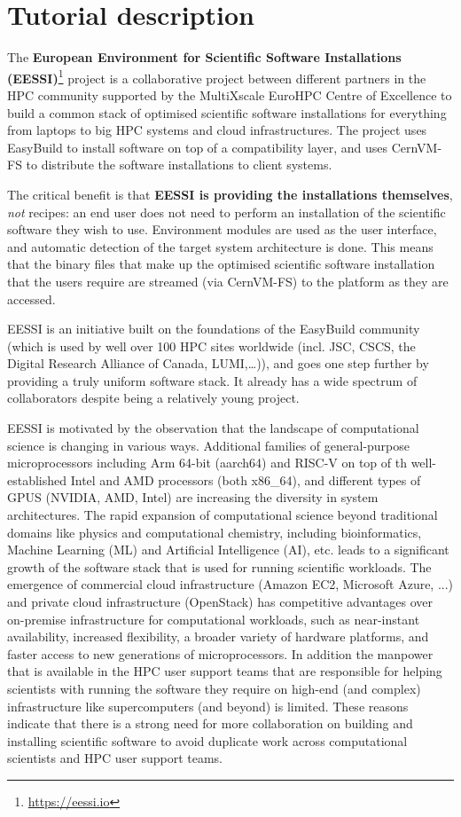 \section*{Tutorial description}

The \textbf{European Environment for Scientific Software Installations
(EESSI)}\footnote{\href{https://eessi.io}{https://eessi.io}} project is a collaborative project
between different partners in the HPC community supported by the MultiXscale EuroHPC Centre of Excellence to build a
common stack of optimised scientific software installations for everything from laptops to big HPC systems and cloud
infrastructures.
The project uses EasyBuild to install software on top of a compatibility layer, and uses CernVM-FS to
distribute the software installations to client systems.

The critical benefit is that \textbf{EESSI is providing the
installations themselves}, \textit{not} recipes: an end user does not need to perform an installation
of the scientific software they wish to use.
Environment modules are used as the user interface, and automatic
detection of the target system architecture is done.
This means that the binary files that make up the optimised
scientific software installation that the users require are streamed (via CernVM-FS) to the platform as they are accessed.

EESSI is an initiative built on the foundations of the EasyBuild community (which is used by well over
100 HPC sites worldwide (incl. JSC, CSCS, the Digital Research Alliance of Canada, LUMI,\ldots)), and goes one
step further by providing a truly uniform software stack.
It already has a wide spectrum of collaborators despite being a relatively young project.

EESSI is motivated by the observation that the landscape of computational science is changing in various ways.
Additional families of general-purpose microprocessors including Arm 64-bit (aarch64) and RISC-V on top of th
well-established Intel and AMD processors (both x86\_64), and different types of GPUS (NVIDIA, AMD, Intel) are
increasing the diversity in system architectures.
The rapid expansion of computational science beyond traditional
domains like physics and computational chemistry, including bioinformatics, Machine Learning (ML) and Artificial
Intelligence (AI), etc. leads to a significant growth of the software stack that is used for running scientific
workloads.
The emergence of commercial cloud infrastructure (Amazon EC2, Microsoft Azure, ...) and private cloud
infrastructure (OpenStack) has competitive advantages over on-premise infrastructure for computational workloads, such
as near-instant availability, increased flexibility, a broader variety of hardware platforms, and faster access to new
generations of microprocessors.
In addition the manpower that is available in the HPC user support teams that are
responsible for helping scientists with running the software they require on high-end (and complex) infrastructure like
supercomputers (and beyond) is limited.
These reasons indicate that there is a strong need for more collaboration on
building and installing scientific software to avoid duplicate work across computational scientists and HPC user support
teams.

